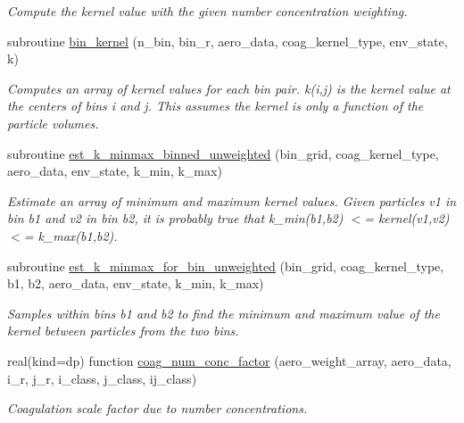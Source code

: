 \begin{DoxyCompactItemize}
\begin{DoxyCompactList}\small\item\em Compute the kernel value with the given number concentration weighting. \end{DoxyCompactList}\item 
subroutine \mbox{\hyperlink{namespacepmc__coag__kernel_a8e624c7ffea2d3cb1b91778b178240da}{bin\+\_\+kernel}} (n\+\_\+bin, bin\+\_\+r, aero\+\_\+data, coag\+\_\+kernel\+\_\+type, env\+\_\+state, k)
\begin{DoxyCompactList}\small\item\em Computes an array of kernel values for each bin pair. k(i,j) is the kernel value at the centers of bins i and j. This assumes the kernel is only a function of the particle volumes. \end{DoxyCompactList}\item 
subroutine \mbox{\hyperlink{namespacepmc__coag__kernel_a3081c503d797de18f273fdc785e2b358}{est\+\_\+k\+\_\+minmax\+\_\+binned\+\_\+unweighted}} (bin\+\_\+grid, coag\+\_\+kernel\+\_\+type, aero\+\_\+data, env\+\_\+state, k\+\_\+min, k\+\_\+max)
\begin{DoxyCompactList}\small\item\em Estimate an array of minimum and maximum kernel values. Given particles v1 in bin b1 and v2 in bin b2, it is probably true that {\ttfamily k\+\_\+min(b1,b2) $<$= kernel(v1,v2) $<$= k\+\_\+max(b1,b2)}. \end{DoxyCompactList}\item 
subroutine \mbox{\hyperlink{namespacepmc__coag__kernel_a3930ee7fd2fbb2c326683ad6b9c08185}{est\+\_\+k\+\_\+minmax\+\_\+for\+\_\+bin\+\_\+unweighted}} (bin\+\_\+grid, coag\+\_\+kernel\+\_\+type, b1, b2, aero\+\_\+data, env\+\_\+state, k\+\_\+min, k\+\_\+max)
\begin{DoxyCompactList}\small\item\em Samples within bins b1 and b2 to find the minimum and maximum value of the kernel between particles from the two bins. \end{DoxyCompactList}\item 
real(kind=dp) function \mbox{\hyperlink{namespacepmc__coag__kernel_a39c314a4ab6418c6c6ff1fc12678de26}{coag\+\_\+num\+\_\+conc\+\_\+factor}} (aero\+\_\+weight\+\_\+array, aero\+\_\+data, i\+\_\+r, j\+\_\+r, i\+\_\+class, j\+\_\+class, ij\+\_\+class)
\begin{DoxyCompactList}\small\item\em Coagulation scale factor due to number concentrations. \end{DoxyCompactList}\item 

\end{DoxyCompactItemize}
